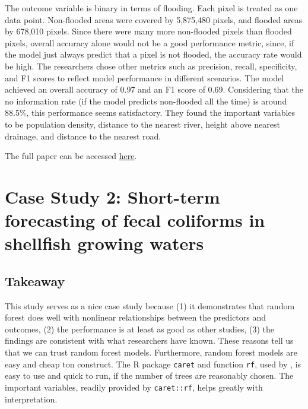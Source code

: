 \documentclass[
]{book}
\begin{document}
The outcome variable is binary in terms of flooding. Each pixel is treated as one data point. Non-flooded areas were covered by 5,875,480 pixels, and flooded areas by 678,010 pixels. Since there were many more non-flooded pixels than flooded pixels, overall accuracy alone would not be a good performance metric, since, if the model just always predict that a pixel is not flooded, the accuracy rate would be high. The researchers chose other metrics such as precision, recall, specificity, and F1 scores to reflect model performance in different scenarios. The model achieved an overall accuracy of 0.97 and an F1 score of 0.69. Considering that the no information rate (if the model predicts non-flooded all the time) is around 88.5\%, this performance seems satisfactory. They found the important variables to be population density, distance to the nearest river, height above nearest drainage, and distance to the nearest road.

The full paper can be accessed \href{https://www.sciencedirect.com/science/article/pii/S1364815223001445?dgcid=author}{here}.

\hypertarget{case-study-2-short-term-forecasting-of-fecal-coliforms-in-shellfish-growing-waters}{%
\section{Case Study 2: Short-term forecasting of fecal coliforms in shellfish growing waters}\label{case-study-2-short-term-forecasting-of-fecal-coliforms-in-shellfish-growing-waters}}

\hypertarget{takeaway-1}{%
\subsection{Takeaway}\label{takeaway-1}}

This study serves as a nice case study because (1) it demonstrates that random forest does well with nonlinear relationships between the predictors and outcomes, (2) the performance is at least as good as other studies, (3) the findings are consistent with what researchers have known. These reasons tell us that we can trust random forest models. Furthermore, random forest models are easy and cheap ton construct. The R package \texttt{caret} and function \texttt{rf}, used by \citet{chazal2024}, is easy to use and quick to run, if the number of trees are reasonably chosen. The important variables, readily provided by \texttt{caret::rf}, helps greatly with interpretation.
\end{document}
